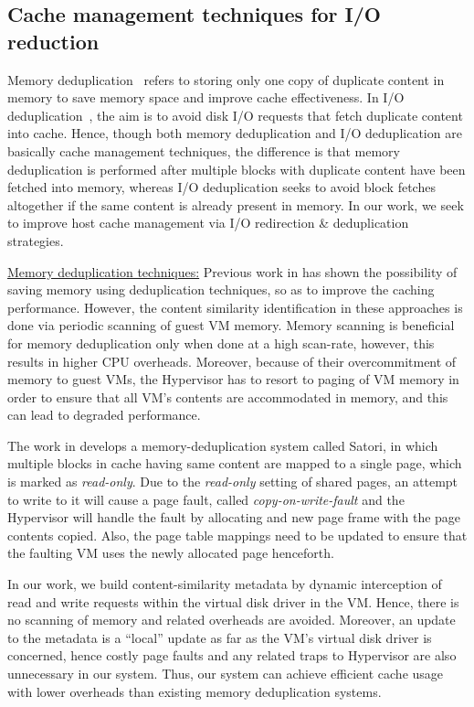 \subsection{Cache management techniques for I/O reduction}
Memory deduplication~\cite{vmware-esx-server, satori, memorybuddies, 
difference-engine, singleton}
refers to storing only one copy of duplicate content in memory to 
save memory space and improve cache effectiveness. 
In I/O deduplication~\cite{iodedup}, the aim is to avoid disk I/O requests
that fetch duplicate content into cache. Hence, though both
memory deduplication and I/O deduplication are basically cache
management techniques\cite{cooperative}, the difference is that
memory deduplication is performed after multiple blocks with duplicate
content have been fetched into memory, whereas I/O deduplication seeks to
avoid block fetches altogether if the same content is already present
in memory. In our work, we seek to improve host cache management via
I/O redirection \& deduplication strategies.

\underline{Memory deduplication techniques:} 
Previous work in \cite{vmware-esx-server, difference-engine} has
shown the possibility of saving memory using deduplication
techniques,
so as to improve the caching performance. However, the content
similarity identification in these approaches is done via periodic
scanning of guest VM memory. Memory scanning is beneficial for 
memory deduplication only when done at a high scan-rate, however,
this results in higher CPU overheads.
Moreover, because of their overcommitment of memory to guest VMs, 
the Hypervisor has to resort to paging of VM memory in order to 
ensure that all VM's contents are accommodated in memory, and this can
lead to degraded performance.

The work in \cite{satori} develops a memory-deduplication 
system called Satori, in which multiple blocks in cache 
having same content are mapped to a single page, which
is marked as \textit{read-only}. Due to the \textit{read-only} 
setting of shared pages, an attempt to write to it will
cause a page fault, called \textit{copy-on-write-fault}
and the Hypervisor will handle the fault by allocating
and new page frame with the page contents copied. Also,
the page table mappings need to be updated to ensure
that the faulting VM uses the newly allocated page
henceforth.

In our work, we build content-similarity metadata
by dynamic interception 
of read and write requests within
the virtual disk driver in the VM. Hence, there is
no scanning of memory and related overheads are avoided.
Moreover, an update to the metadata is a ``local''
update as far as the VM's virtual disk driver is
concerned, hence costly page faults and any related
traps to Hypervisor are also unnecessary in our system. Thus, 
our system can achieve efficient cache usage 
with lower overheads than existing memory deduplication 
systems.

